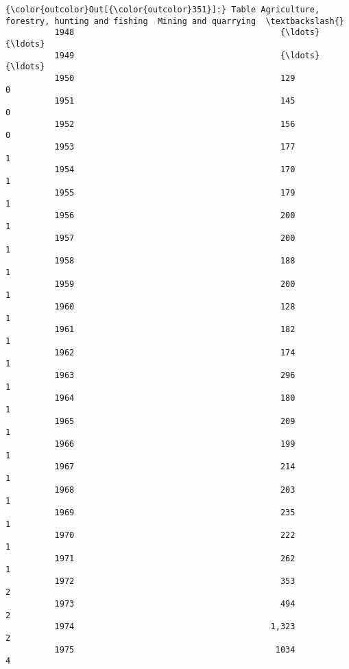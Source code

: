 \documentclass[11pt]{article}
\begin{document}
\begin{Verbatim}[commandchars=\\\{\}]
{\color{outcolor}Out[{\color{outcolor}351}]:} Table Agriculture, forestry, hunting and fishing  Mining and quarrying  \textbackslash{}
          1948                                          {\ldots}                  {\ldots}   
          1949                                          {\ldots}                  {\ldots}   
          1950                                          129                    0   
          1951                                          145                    0   
          1952                                          156                    0   
          1953                                          177                    1   
          1954                                          170                    1   
          1955                                          179                    1   
          1956                                          200                    1   
          1957                                          200                    1   
          1958                                          188                    1   
          1959                                          200                    1   
          1960                                          128                    1   
          1961                                          182                    1   
          1962                                          174                    1   
          1963                                          296                    1   
          1964                                          180                    1   
          1965                                          209                    1   
          1966                                          199                    1   
          1967                                          214                    1   
          1968                                          203                    1   
          1969                                          235                    1   
          1970                                          222                    1   
          1971                                          262                    1   
          1972                                          353                    2   
          1973                                          494                    2   
          1974                                        1,323                    2   
          1975                                         1034                    4   
          

\end{Verbatim}
\end{document}
